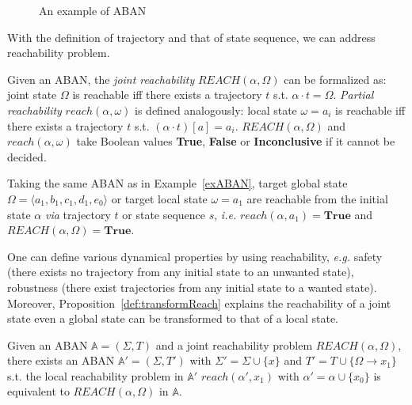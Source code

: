 \begin{figure}[ht]
\centering

\caption[Example of ABAN]{An example of ABAN}\label{fig:exampleABAN}
\end{figure}

With the definition of trajectory and that of state sequence, we can address reachability problem.

\begin{definition}
Given an ABAN, the \textit{joint reachability} $REACH (\alpha,\Omega)$ can be formalized as: joint state $\Omega$ is reachable iff there exists a trajectory $t$ s.t. $\alpha\cdot t=\Omega$.
\textit{Partial reachability} $reach(\alpha,\omega)$ is defined analogously: local state $\omega=a_i$ is reachable iff there exists a trajectory $t$ s.t. $(\alpha\cdot t)[a]=a_i$.
$REACH (\alpha,\Omega)$ and $reach(\alpha,\omega)$ take Boolean values \textbf{True}, \textbf{False} or \textbf{Inconclusive} if it cannot be decided.
\end{definition}

\begin{example}
Taking the same ABAN as in Example~\ref{exABAN}, target global state $\Omega=\langle a_1,b_1,c_1,d_1,e_0\rangle$ or target local state $\omega=a_1$ are reachable from the initial state $\alpha$ \textit{via} trajectory $t$ or state sequence $s$, \textit{i.e.} $reach(\alpha,a_1)=\textbf{True}$ and $REACH(\alpha,\Omega)=\textbf{True}$. 
\end{example}

One can define various dynamical properties by using reachability, \textit{e.g.} safety (there exists no trajectory from any initial state to an unwanted state), robustness (there exist trajectories from any initial state to a wanted state).
Moreover, Proposition~\ref{def:transformReach} explains the reachability of a joint state even a global state can be transformed to that of a local state.

\begin{proposition}\label{def:transformReach}
Given an ABAN $\mathbb{A}=(\Sigma,T)$ and a joint reachability problem $REACH(\alpha,\Omega)$, there exists an ABAN $\mathbb{A}'=(\Sigma,T')$ with $\Sigma'=\Sigma\cup\{x\}$ and $T'=T\cup\{\Omega\to x_1\}$ s.t. the local reachability problem in $\mathbb{A}'$ $reach(\alpha', x_1)$ with $\alpha'=\alpha\cup\{x_0\}$ is equivalent to $REACH(\alpha,\Omega)$ in $\mathbb{A}$.
\end{proposition}

